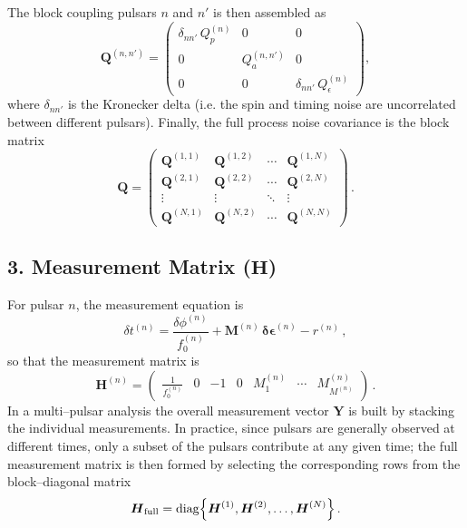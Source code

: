 \documentclass[]{scrartcl}
\begin{document}
	The block coupling pulsars $n$ and $n'$ is then assembled as
	\begin{equation}
		\boldsymbol{Q}^{(n,n')} = \begin{pmatrix}
			\delta_{nn'}\, Q_p^{(n)} & 0 & 0 \\[2mm]
			0 & Q_a^{(n,n')} & 0 \\[2mm]
			0 & 0 & \delta_{nn'}\, Q_\epsilon^{(n)}
		\end{pmatrix},
	\end{equation}
	where $\delta_{nn'}$ is the Kronecker delta (i.e. the spin and timing noise are uncorrelated between different pulsars). Finally, the full process noise covariance is the block matrix
	\begin{equation}
		\boldsymbol{Q} = \begin{pmatrix}
			\boldsymbol{Q}^{(1,1)} & \boldsymbol{Q}^{(1,2)} & \cdots & \boldsymbol{Q}^{(1,N)} \\[1mm]
			\boldsymbol{Q}^{(2,1)} & \boldsymbol{Q}^{(2,2)} & \cdots & \boldsymbol{Q}^{(2,N)} \\[1mm]
			\vdots & \vdots & \ddots & \vdots \\[1mm]
			\boldsymbol{Q}^{(N,1)} & \boldsymbol{Q}^{(N,2)} & \cdots & \boldsymbol{Q}^{(N,N)}
		\end{pmatrix}\,.
	\end{equation}
	
	\subsection*{3. Measurement Matrix (\(\boldsymbol{H}\))}
	
	For pulsar $n$, the measurement equation is
	\begin{equation}
		\delta t^{(n)} = \frac{\delta\phi^{(n)}}{f_0^{(n)}} + \boldsymbol{M}^{(n)}\,\boldsymbol{\delta\epsilon}^{(n)} - r^{(n)}\,,
	\end{equation}
	so that the measurement matrix is
	\begin{equation}
		\boldsymbol{H}^{(n)} = \begin{pmatrix}
			\frac{1}{f_0^{(n)}} & 0 & -1 & 0 & M_1^{(n)} & \cdots & M_{M^{(n)}}^{(n)}
		\end{pmatrix}\,.
	\end{equation}
	In a multi–pulsar analysis the overall measurement vector $\boldsymbol{Y}$ is built by stacking the individual measurements. In practice, since pulsars are generally observed at different times, only a subset of the pulsars contribute at any given time; the full measurement matrix is then formed by selecting the corresponding rows from the block–diagonal matrix
	\begin{equation}
		\boldsymbol{H}_{\mathrm{full}} = \mathrm{diag}\Bigl\{\boldsymbol{H}^{(1)},\boldsymbol{H}^{(2)},\ldots,\boldsymbol{H}^{(N)}\Bigr\}\,.
	\end{equation}
	
\end{document}
